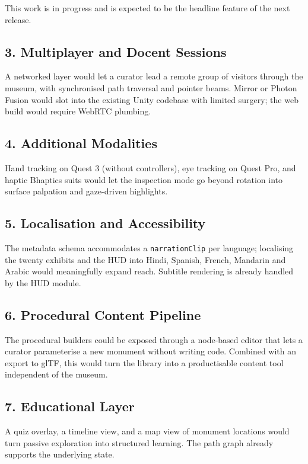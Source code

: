 This work is in progress and is expected to be the headline feature of the next release.

\subsection{3. Multiplayer and Docent Sessions}

A networked layer would let a curator lead a remote group of visitors through the museum, with synchronised path traversal and pointer beams. Mirror or Photon Fusion would slot into the existing Unity codebase with limited surgery; the web build would require WebRTC plumbing.

\subsection{4. Additional Modalities}

Hand tracking on Quest 3 (without controllers), eye tracking on Quest Pro, and haptic Bhaptics suits would let the inspection mode go beyond rotation into surface palpation and gaze-driven highlights.

\subsection{5. Localisation and Accessibility}

The metadata schema accommodates a \texttt{narrationClip} per language; localising the twenty exhibits and the HUD into Hindi, Spanish, French, Mandarin and Arabic would meaningfully expand reach. Subtitle rendering is already handled by the HUD module.

\subsection{6. Procedural Content Pipeline}

The procedural builders could be exposed through a node-based editor that lets a curator parameterise a new monument without writing code. Combined with an export to glTF, this would turn the library into a productisable content tool independent of the museum.

\subsection{7. Educational Layer}

A quiz overlay, a timeline view, and a map view of monument locations would turn passive exploration into structured learning. The path graph already supports the underlying state.


